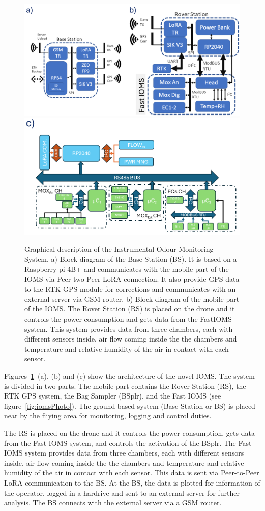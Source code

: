 \documentclass[lettersize,journal]{IEEEtran}
\begin{document}
\begin{figure}[t] %
	\centering
	\includegraphics[width=0.53\linewidth]{./images/fig1_ab.png}
	\hfill
	\includegraphics[width=0.45\linewidth]{./images/fig1_c.png}
	\hfill
	\caption{Graphical description of the Instrumental Odour Monitoring System. a) Block diagram of the Base Station (BS). It is based on a Raspberry pi 4B+ and communicates with the mobile part of the IOMS via Peer two Peer LoRA connection. It also provide GPS data to the RTK GPS module for corrections and communicates with an external server via GSM router. b) Block diagram of the mobile part of the IOMS. The Rover Station (RS) is placed on the drone and it controls the power consumption and gets data from the FastIOMS system. This system provides data from three chambers, each with different sensors inside, air flow coming inside the the chambers and temperature and relative humidity of the air in contact with each sensor.}
	\label{fig:iomsDescp}
\end{figure}

Figures~\ref{fig:iomsDescp}~(a), (b) and (c) show the architecture of the novel IOMS. The system is divided in two parts. The mobile part contains the Rover Station (RS), the RTK GPS system, the Bag Sampler (BSplr), and the Fast IOMS (see figure~\ref{fig:iomsPhoto}). The ground based system (Base Station or BS) is placed near by the fliying area for monitoring, logging and control duties.

The RS is placed on the drone and it controls the power consumption, gets data from the Fast-IOMS system, and controls the activation of the BSplr. The Fast-IOMS system provides data from three chambers, each with different sensors inside, air flow coming inside the the chambers and temperature and relative humidity of the air in contact with each sensor. This data is sent via Peer-to-Peer LoRA communication to the BS. At the BS, the data is plotted for information of the operator, logged in a hardrive and sent to an external server for further analysis. The BS connects with the external server via a GSM router.
\end{document}
